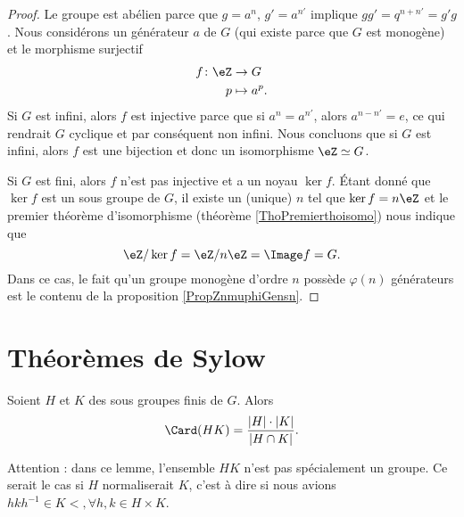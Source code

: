 \begin{proof}
    Le groupe est abélien parce que $g=a^n$, \( g'=a^{n'}\) implique \( gg'=q^{n+n'}=g'g\). Nous considérons un générateur \( a\) de \( G\) (qui existe parce que $G$ est monogène) et le morphisme surjectif
    \begin{equation}
        \begin{aligned}
            f\colon \eZ&\to G \\
            p&\mapsto a^p. 
        \end{aligned}
    \end{equation}
    Si \( G\) est infini, alors \( f\) est injective parce que si \( a^n=a^{n'}\), alors \( a^{n-n'}=e\), ce qui rendrait \( G\) cyclique et par conséquent non infini. Nous concluons que si \( G\) est infini, alors \( f\) est une bijection et donc un isomorphisme \( \eZ\simeq G\).

    Si \( G\) est fini, alors \( f\) n'est pas injective et a un noyau \( \ker f\). Étant donné que \( \ker f\) est un sous groupe de \( G\), il existe un (unique) \( n\) tel que \( \ker f=n\eZ\) et le premier théorème d'isomorphisme (théorème \ref{ThoPremierthoisomo}) nous indique que
    \begin{equation}
        \eZ/\ker f=\eZ/n\eZ=\Image f=G.
    \end{equation}
    Dans ce cas, le fait qu'un groupe monogène d'ordre \( n\) possède \( \varphi(n)\) générateurs est le contenu de la proposition \ref{PropZnmuphiGensn}.
\end{proof}

\section{Théorèmes de Sylow}

\begin{lemma}
    Soient \( H\) et \( K\) des sous groupes finis de \( G\). Alors
    \begin{equation}
        \Card(HK)=\frac{ | H |\cdot | K | }{ | H\cap K | }.
    \end{equation}
\end{lemma} 
Attention : dans ce lemme, l'ensemble \( HK\) n'est pas spécialement un groupe. Ce serait le cas si \( H\) normaliserait \( K\), c'est à dire si nous avions \( hkh^{-1}\in K<,\forall h,k\in H\times K\).

